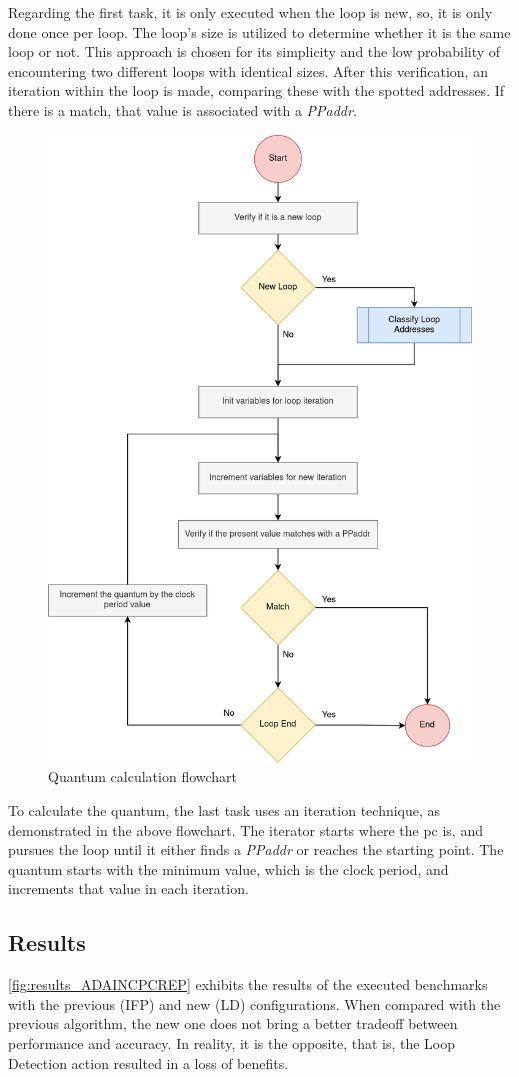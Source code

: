 Regarding the first task, it is only executed when the loop is new, so, it is only done once per loop. The loop's size is utilized to 
determine whether it is the same loop or not. This approach is chosen for its simplicity and the low probability of encountering two different 
loops with identical sizes. After this verification, an iteration within the loop is made, comparing these with the spotted addresses. If there 
is a match, that value is associated with a \textit{PPaddr}. 

\begin{figure}[H]
	\centering
 	\includegraphics[width=0.5\linewidth]{Images/Repetition_flowchart_quantum.png}
 	\caption{Quantum calculation flowchart}
	 \label{fig_Repetition_flowchart_quantum}
\end{figure}

To calculate the quantum, the last task uses an iteration technique, as demonstrated in the above flowchart. 
The iterator starts where the \gls{pc} is, and pursues the loop until it either finds a \textit{PPaddr} or reaches the starting point. 
The quantum starts with the minimum value, which is the clock period, and increments that value in each iteration.

\subsection{Results}

\autoref{fig:results_ADAINCPCREP} exhibits the results of the executed benchmarks with the previous (IFP) and new (LD) configurations. 
When compared with the previous algorithm, the new one does not bring a better tradeoff between performance and accuracy. 
In reality, it is the opposite, that is, the Loop Detection action resulted in a loss of benefits. 



